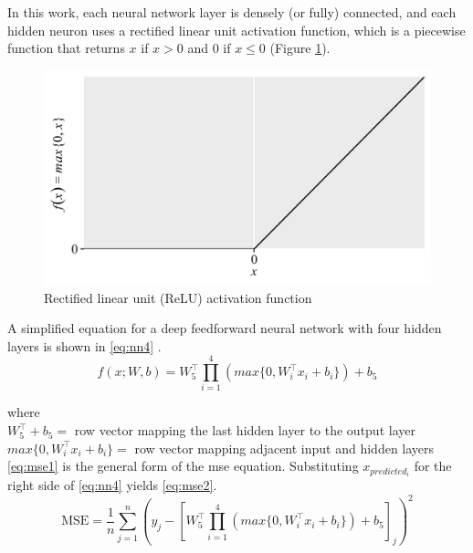In this work, each neural network layer is densely (or fully) connected, and each hidden neuron uses a rectified linear unit activation function, which is a piecewise function that returns $x$ if $x > 0$ and 0 if $x \leq 0$ (Figure \ref{fig:relu}).

\vspace{+0.6cm}
\begin{figure}[H]
  \centering
  \includegraphics[scale=1]{figures/relu.png}
  \caption{Rectified linear unit (ReLU) activation function}
  \label{fig:relu}
\end{figure}

\noindent A simplified equation for a deep feedforward neural network with four hidden layers is shown in \ref{eq:nn4} \cite{goodfellow}.
%
\begin{equation}
  \label{eq:nn4}
  f(x; W, b) = W_{5}^{\top} \prod_{i = 1}^{4} \left( max \{ 0, W_{i}^{\top} x_{i} + b_{i} \} \right) + b_{5}
\end{equation}

\noindent where \\
\indent $W_{5}^{\top} + b_{5} = $ row vector mapping the last hidden layer to the output layer \\
\indent $max \{ 0, W_{i}^{\top} x_{i} + b_{i} \} = $ row vector mapping adjacent input and hidden layers \\

\noindent \ref{eq:mse1} is the general form of the \gls{mse} equation.
Substituting $x_{predicted_{i}}$ for the right side of \ref{eq:nn4} yields \ref{eq:mse2}.
%
\begin{equation}
  \label{eq:mse2}
  \mbox{MSE} = \frac{1}{n} \sum_{j = 1}^{n} \left( y_{j} - \left[ W_{5}^{\top} \prod_{i = 1}^{4} \left( max \{ 0, W_{i}^{\top} x_{i} + b_{i} \} \right) + b_{5} \right]_{j} \right)^{2}
\end{equation}

